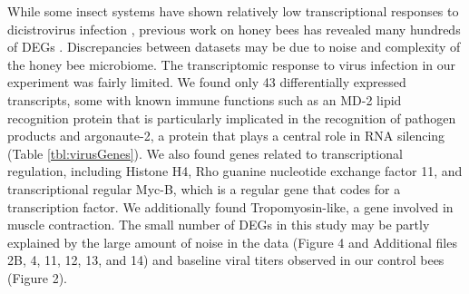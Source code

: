\documentclass{bmcart}
\begin{document}
\begin{linenumbers}
\begin{doublespacing}
While some insect systems have shown relatively low transcriptional responses to dicistrovirus infection \cite{fewDEGs, fewDEGs2}, previous work on honey bees has revealed many hundreds of DEGs \cite{galbraith}. Discrepancies between datasets may be due to noise and complexity of the honey bee microbiome. The transcriptomic response to virus infection in our experiment was fairly limited. We found only 43 differentially expressed transcripts, some with known immune functions such as an MD-2 lipid recognition protein that is particularly implicated in the recognition of pathogen products and argonaute-2, a protein that plays a central role in RNA silencing (Table \ref{tbl:virusGenes}). We also found genes related to transcriptional regulation, including Histone H4, Rho guanine nucleotide exchange factor 11, and transcriptional regular Myc-B, which is a regular gene that codes for a transcription factor. We additionally found Tropomyosin-like, a gene involved in muscle contraction. The small number of DEGs in this study may be partly explained by the large amount of noise in the data (Figure 4 and Additional files 2B, 4, 11, 12, 13, and 14) and baseline viral titers observed in our control bees (Figure 2).


\end{doublespacing}
\end{linenumbers}
\end{document}
